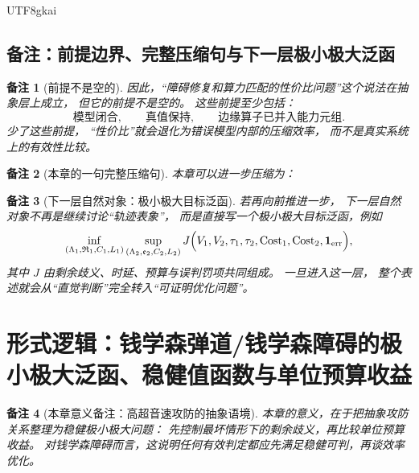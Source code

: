 \documentclass[12pt]{article}
\newtheorem{remark}{备注}[section]
\begin{document}
\begin{CJK*}{UTF8}{gkai}
\subsection{备注：前提边界、完整压缩句与下一层极小极大泛函}
\label{subsec:tex1-ch3-remarks}

\begin{remark}[前提不是空的]
因此，“障碍修复和算力匹配的性价比问题”这个说法在抽象层上成立，
但它的前提不是空的。
这些前提至少包括：
\[
  \text{模型闭合},
  \qquad
  \text{真值保持},
  \qquad
  \text{边缘算子已并入能力元组}.
\]
少了这些前提，
“性价比”就会退化为错误模型内部的压缩效率，
而不是真实系统上的有效性比较。
\end{remark}

\begin{remark}[本章的一句完整压缩句]
本章可以进一步压缩为：
\begin{center}
\end{center}
\end{remark}

\begin{remark}[下一层自然对象：极小极大目标泛函]
若再向前推进一步，
下一层自然对象不再是继续讨论“轨迹表象”，
而是直接写一个极小极大目标泛函，例如
\[
  \inf_{(\Lambda_1,\mathfrak R_1,C_1,L_1)}
  \sup_{(\Lambda_2,\mathfrak e_2,C_2,L_2)}
  J\Bigl(
    V_1,V_2,\tau_1,\tau_2,\operatorname{Cost}_1,\operatorname{Cost}_2,\mathbf 1_{\mathrm{err}}
  \Bigr),
\]
其中 $J$ 由剩余歧义、时延、预算与误判罚项共同组成。
一旦进入这一层，
整个表述就会从“直觉判断”完全转入“可证明优化问题”。
\end{remark}

\clearpage
\section{形式逻辑：钱学森弹道/钱学森障碍的极小极大泛函、稳健值函数与单位预算收益}
\label{sec:tex1-ch4}

\begin{remark}[本章意义备注：高超音速攻防的抽象语境]
本章的意义，在于把抽象攻防关系整理为稳健极小极大问题：
先控制最坏情形下的剩余歧义，再比较单位预算收益。
对钱学森障碍而言，这说明任何有效判定都应先满足稳健可判，再谈效率优化。
\end{remark}


\end{CJK*}
\end{document}
